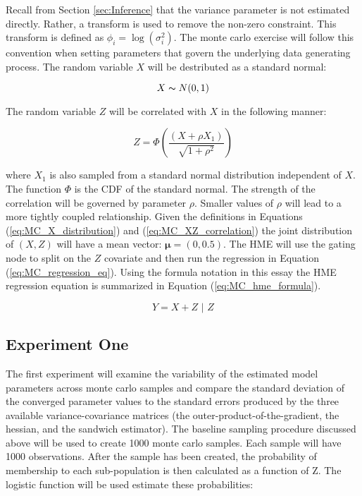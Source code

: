 \documentclass[12pt]{article}
\theoremstyle{definition}
\begin{document}
Recall from Section \ref{sec:Inference} that the variance parameter is not estimated directly. Rather, a transform is used to remove the non-zero constraint. This transform is defined as $\phi_{i} = \log(\sigma^{2}_{i})$. The monte carlo exercise will follow this convention when setting parameters that govern the underlying data generating process. The random variable $X$ will be destributed as a standard normal:

\begin{equation} \label{eq:MC_X_distribution}
    X \thicksim N(0, 1)
\end{equation}

The random variable $Z$ will be correlated with $X$ in the following manner:

\begin{equation} \label{eq:MC_XZ_correlation}
    Z = \Phi \left( \frac{(X + \rho X_{1})}{\sqrt{1 + \rho^{2}}} \right)
\end{equation}

where $X_{1}$ is also sampled from a standard normal distribution independent of $X$. The function $\Phi$ is the CDF of the standard normal. The strength of the correlation will be governed by parameter $\rho$. Smaller values of $\rho$ will lead to a more tightly coupled relationship. Given the definitions in Equations (\ref{eq:MC_X_distribution}) and (\ref{eq:MC_XZ_correlation}) the joint distribution of $(X, Z)$ will have a mean vector: $\boldsymbol{\mu} = (0, 0.5)$. The HME will use the gating node to split on the $Z$ covariate and then run the regression in Equation (\ref{eq:MC_regression_eq}). Using the formula notation in this essay the HME regression equation is summarized in Equation (\ref{eq:MC_hme_formula}).

\begin{equation} \label{eq:MC_hme_formula}
    Y = X + Z \,\,|\,\, Z
\end{equation}

\subsection{Experiment One}



The first experiment will examine the variability of the estimated model parameters across monte carlo samples and compare the standard deviation of the converged parameter values to the standard errors produced by the three available variance-covariance matrices (the outer-product-of-the-gradient, the hessian, and the sandwich estimator). The baseline sampling procedure discussed above will be used to create 1000 monte carlo samples. Each sample will have 1000 observations. After the sample has been created, the probability of membership to each sub-population is then calculated as a function of Z. The logistic function will be used estimate these probabilities:
\end{document}
